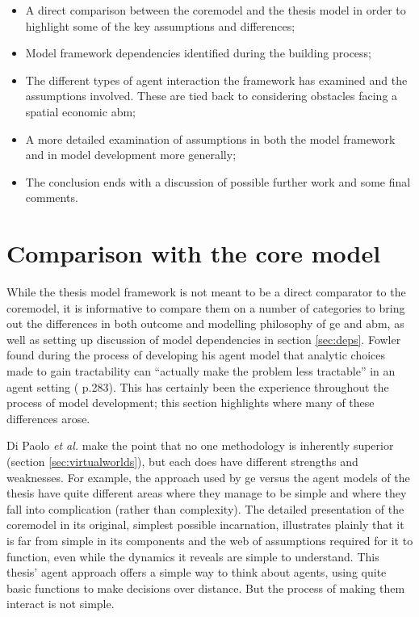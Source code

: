 \begin{itemize}
	\item A direct comparison between the \gls{coremodel} and the thesis model in order to highlight some of the key assumptions and differences;
	\item Model framework dependencies identified during the building process;
	\item The different types of agent interaction the framework has examined and the assumptions involved. These are tied back to considering obstacles facing a spatial economic \gls{abm};
	\item A more detailed examination of assumptions in both the model framework and in model development more generally;
	\item The conclusion ends with a discussion of possible further work and some final comments.
\end{itemize}

\section{Comparison with the core model \label{cmcomp}}

While the thesis model framework is not meant to be a direct comparator to the \gls{coremodel}, it is informative to compare them on a number of categories to bring out the differences in both outcome and modelling philosophy of \gls{ge} and \gls{abm}, as well as setting up discussion of model dependencies in section \ref{sec:deps}. Fowler found during the process of developing his agent model that analytic choices made to gain tractability can ``actually make the problem less tractable'' in an agent setting (\citealt{fowler_taking_2007} p.283). This has certainly been the experience throughout the process of model development; this section highlights where many of these differences arose.

Di Paolo \emph{et al.} make the point that no one methodology is inherently superior (section \ref{sec:virtualworlds}), but each does have different strengths and weaknesses. For example, the approach used by \gls{ge} versus the agent models of the thesis have quite different areas where they manage to be simple and where they fall into complication (rather than complexity). The detailed presentation of the \gls{coremodel} in its original, simplest possible incarnation, illustrates plainly that it is far from simple in its components and the web of assumptions required for it to function, even while the dynamics it reveals are simple to understand. This thesis' agent approach offers a simple way to think about agents, using quite basic functions to make decisions over distance. But the process of making them interact is not simple.


